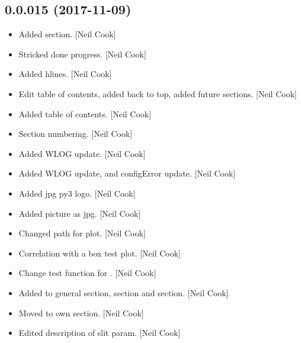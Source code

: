 \documentclass[a4paper,10pt,english]{report}
\begin{document}
\subsection{0.0.015 (2017-11-09)}
\label{\detokenize{misc/changelog:id535}}\begin{itemize}
\item {} 
Added  section. {[}Neil Cook{]}

\item {} 
Stricked done progress. {[}Neil Cook{]}

\item {} 
Added hlines. {[}Neil Cook{]}

\item {} 
Edit table of contents, added back to top, added future sections.
{[}Neil Cook{]}

\item {} 
Added table of contents. {[}Neil Cook{]}

\item {} 
Section numbering. {[}Neil Cook{]}

\item {} 
Added WLOG update. {[}Neil Cook{]}

\item {} 
Added WLOG update, and configError update. {[}Neil Cook{]}

\item {} 
Added jpg py3 logo. {[}Neil Cook{]}

\item {} 
Added picture as jpg. {[}Neil Cook{]}

\item {} 
Changed path for plot. {[}Neil Cook{]}

\item {} 
Correlation with a box test plot. {[}Neil Cook{]}

\item {} 
Change test function for . {[}Neil Cook{]}

\item {} 
Added to general section,  section and  section. {[}Neil
Cook{]}

\item {} 
Moved  to own section. {[}Neil Cook{]}

\item {} 
Edited description of slit param. {[}Neil Cook{]}

\end{itemize}
\end{document}
